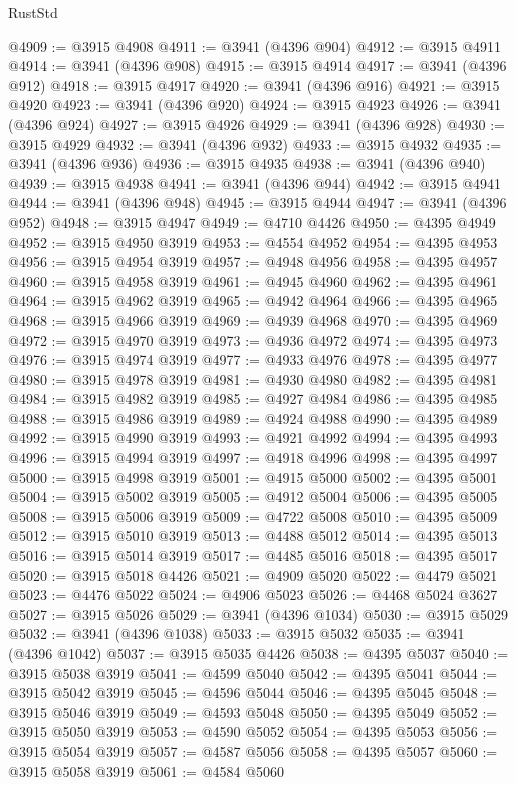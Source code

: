\begin{lexlean}{RustStd}
\begin{coremodule}
@4909 := @3915 @4908
@4911 := @3941 (@4396 @904)
@4912 := @3915 @4911
@4914 := @3941 (@4396 @908)
@4915 := @3915 @4914
@4917 := @3941 (@4396 @912)
@4918 := @3915 @4917
@4920 := @3941 (@4396 @916)
@4921 := @3915 @4920
@4923 := @3941 (@4396 @920)
@4924 := @3915 @4923
@4926 := @3941 (@4396 @924)
@4927 := @3915 @4926
@4929 := @3941 (@4396 @928)
@4930 := @3915 @4929
@4932 := @3941 (@4396 @932)
@4933 := @3915 @4932
@4935 := @3941 (@4396 @936)
@4936 := @3915 @4935
@4938 := @3941 (@4396 @940)
@4939 := @3915 @4938
@4941 := @3941 (@4396 @944)
@4942 := @3915 @4941
@4944 := @3941 (@4396 @948)
@4945 := @3915 @4944
@4947 := @3941 (@4396 @952)
@4948 := @3915 @4947
@4949 := @4710 @4426
@4950 := @4395 @4949
@4952 := @3915 @4950 @3919
@4953 := @4554 @4952
@4954 := @4395 @4953
@4956 := @3915 @4954 @3919
@4957 := @4948 @4956
@4958 := @4395 @4957
@4960 := @3915 @4958 @3919
@4961 := @4945 @4960
@4962 := @4395 @4961
@4964 := @3915 @4962 @3919
@4965 := @4942 @4964
@4966 := @4395 @4965
@4968 := @3915 @4966 @3919
@4969 := @4939 @4968
@4970 := @4395 @4969
@4972 := @3915 @4970 @3919
@4973 := @4936 @4972
@4974 := @4395 @4973
@4976 := @3915 @4974 @3919
@4977 := @4933 @4976
@4978 := @4395 @4977
@4980 := @3915 @4978 @3919
@4981 := @4930 @4980
@4982 := @4395 @4981
@4984 := @3915 @4982 @3919
@4985 := @4927 @4984
@4986 := @4395 @4985
@4988 := @3915 @4986 @3919
@4989 := @4924 @4988
@4990 := @4395 @4989
@4992 := @3915 @4990 @3919
@4993 := @4921 @4992
@4994 := @4395 @4993
@4996 := @3915 @4994 @3919
@4997 := @4918 @4996
@4998 := @4395 @4997
@5000 := @3915 @4998 @3919
@5001 := @4915 @5000
@5002 := @4395 @5001
@5004 := @3915 @5002 @3919
@5005 := @4912 @5004
@5006 := @4395 @5005
@5008 := @3915 @5006 @3919
@5009 := @4722 @5008
@5010 := @4395 @5009
@5012 := @3915 @5010 @3919
@5013 := @4488 @5012
@5014 := @4395 @5013
@5016 := @3915 @5014 @3919
@5017 := @4485 @5016
@5018 := @4395 @5017
@5020 := @3915 @5018 @4426
@5021 := @4909 @5020
@5022 := @4479 @5021
@5023 := @4476 @5022
@5024 := @4906 @5023
@5026 := @4468 @5024 @3627
@5027 := @3915 @5026
@5029 := @3941 (@4396 @1034)
@5030 := @3915 @5029
@5032 := @3941 (@4396 @1038)
@5033 := @3915 @5032
@5035 := @3941 (@4396 @1042)
@5037 := @3915 @5035 @4426
@5038 := @4395 @5037
@5040 := @3915 @5038 @3919
@5041 := @4599 @5040
@5042 := @4395 @5041
@5044 := @3915 @5042 @3919
@5045 := @4596 @5044
@5046 := @4395 @5045
@5048 := @3915 @5046 @3919
@5049 := @4593 @5048
@5050 := @4395 @5049
@5052 := @3915 @5050 @3919
@5053 := @4590 @5052
@5054 := @4395 @5053
@5056 := @3915 @5054 @3919
@5057 := @4587 @5056
@5058 := @4395 @5057
@5060 := @3915 @5058 @3919
@5061 := @4584 @5060

\end{coremodule}
\end{lexlean}

